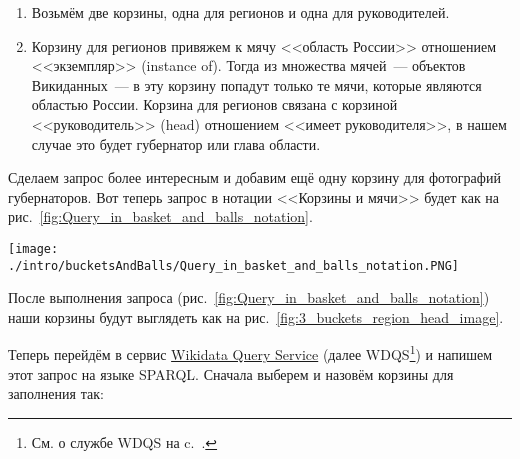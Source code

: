 \begin{enumerate}
    \item Возьмём две корзины, одна для регионов и одна для руководителей.
    \item Корзину для регионов привяжем к мячу <<область России>> отношением <<экземпляр>> (instance of). Тогда из множества мячей~--- объектов Викиданных~--- в эту корзину попадут только те мячи, которые являются областью России. Корзина для регионов связана с корзиной <<руководитель>> (head) отношением <<имеет руководителя>>, в нашем случае это будет губернатор или глава области.
\end{enumerate}

Сделаем запрос более интересным и добавим ещё одну корзину для фотографий губернаторов. Вот теперь запрос в нотации <<Корзины и мячи>> будет как на рис.~\ref{fig:Query_in_basket_and_balls_notation}.

\begin{figure*}[h!]
    \texttt{[image: ./intro/bucketsAndBalls/Query\_in\_basket\_and\_balls\_notation.PNG]}
    \caption[Запрос в нотации <<Корзины и мячи>> для заполнения корзин мячами.]{Запрос в нотации <<Корзины и мячи>> для заполнения корзин <<регион>> мячами <<область России>>, корзины <<руководитель>>~--- губернаторами или главами области, корзины <<изображение>>~--- их фотографиями.}
	\label{fig:Query_in_basket_and_balls_notation}
\end{figure*}

\newpage
После выполнения запроса (рис.~\ref{fig:Query_in_basket_and_balls_notation}) наши корзины будут выглядеть как на рис.~\ref{fig:3_buckets_region_head_image}.

\begin{marginfigure}
	{
		\setlength{\fboxsep}{0pt}%
		\setlength{\fboxrule}{1pt}%
	}
    \caption[Заполненные корзины после выполнении запроса.]{Корзины после выполнении запроса на рис.~\ref{fig:Query_in_basket_and_balls_notation}. \textit{?region}~--- это области России, \textit{?head}~--- это руководители, \textit{?image}~--- это фотографии руководства.}
	\label{fig:3_buckets_region_head_image}
\end{marginfigure}

Теперь перейдём в сервис \href{https://query.wikidata.org/}{Wikidata Query Service} 
(далее WDQS\footnote[][15pt]{См. о службе WDQS на c.~\pageref{sect:WDQS}.})  и напишем этот запрос на языке SPARQL. Сначала выберем и назовём корзины для заполнения так:

